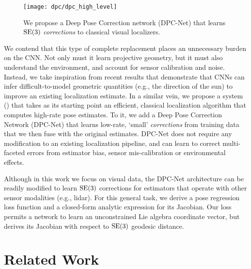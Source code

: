 \begin{figure*}[h!]
	\centering
	\texttt{[image: dpc/dpc\_high\_level]}
	\caption{We propose a Deep Pose Correction network (DPC-Net) that learns $\mathrm{SE}(3)$ \textit{corrections} to classical visual localizers.}
	\label{fig:dpc_system_overview}
\end{figure*}



We contend that this type of complete replacement places an unnecessary burden on the CNN. Not only must it learn projective geometry, but it must also understand the environment, and account for sensor calibration and noise.  Instead, we take inspiration from recent results \citep{2017_Peretroukhin_Reducing} that demonstrate that CNNs can infer difficult-to-model geometric quantities (e.g., the direction of the sun) to improve an existing localization estimate.  
In a similar vein, we propose a system () that takes as its starting point an efficient, classical localization algorithm that computes high-rate pose estimates. To it, we add a Deep Pose Correction Network (DPC-Net) that learns low-rate, `small' \textit{corrections} from training data that we then fuse with the original estimates. DPC-Net does not require any modification to an existing localization pipeline, and can learn to correct multi-faceted errors from estimator bias, sensor mis-calibration or environmental effects.  

Although in this work we focus on visual data, the DPC-Net architecture can be readily modified to learn $\mathrm{SE}(3)$ corrections for estimators that operate with other sensor modalities (e.g., lidar). For this general task, we derive a pose regression loss function and a closed-form analytic expression for its Jacobian. Our loss permits a network to learn an unconstrained Lie algebra coordinate vector, but derives its Jacobian with respect to $\mathrm{SE}(3)$ geodesic distance. 



\section{Related Work}

